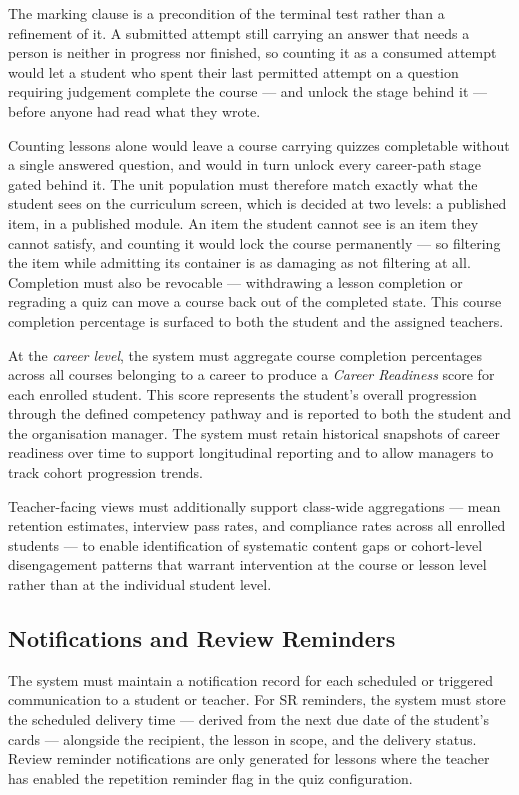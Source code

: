 The marking clause is a precondition of the terminal test rather than
a refinement of it. A submitted attempt still carrying an answer that
needs a person is neither in progress nor finished, so counting it as
a consumed attempt would let a student who spent their last permitted
attempt on a question requiring judgement complete the course — and
unlock the stage behind it — before anyone had read what they wrote.

Counting lessons alone would leave a course carrying quizzes
completable without a single answered question, and would in turn
unlock every career-path stage gated behind it. The unit population
must therefore match exactly what the student sees on the curriculum
screen, which is decided at two levels: a published item, in a
published module. An item the student cannot see is an item they
cannot satisfy, and counting it would lock the course permanently ---
so filtering the item while admitting its container is as damaging as
not filtering at all. Completion must
also be revocable — withdrawing a lesson completion or regrading a
quiz can move a course back out of the completed state. This course
completion percentage is surfaced to both the student and the
assigned teachers.

At the \textit{career level}, the system must aggregate course 
completion percentages across all courses belonging to a career to 
produce a \textit{Career Readiness} score for each enrolled student. 
This score represents the student's overall progression through the 
defined competency pathway and is reported to both the student and 
the organisation manager. The system must retain historical snapshots 
of career readiness over time to support longitudinal reporting and 
to allow managers to track cohort progression trends.

Teacher-facing views must additionally support class-wide aggregations 
— mean retention estimates, interview pass rates, and compliance rates 
across all enrolled students — to enable identification of systematic 
content gaps or cohort-level disengagement patterns that warrant 
intervention at the course or lesson level rather than at the 
individual student level.

\subsection{Notifications and Review Reminders}
The system must maintain a notification record for each scheduled or 
triggered communication to a student or teacher. For SR 
reminders, the system must store the scheduled delivery time — derived 
from the next due date of the student's cards — alongside the 
recipient, the lesson in scope, and the delivery status. Review 
reminder notifications are only generated for lessons where the 
teacher has enabled the repetition reminder flag in the quiz 
configuration.

